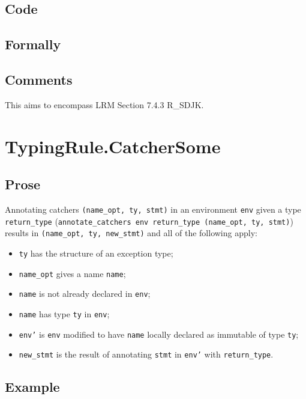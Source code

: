\documentclass{book}
\begin{document}
  \subsection{Code}

\begin{emptyformal}
    \subsection{Formally}
\end{emptyformal}

\subsection{Comments}
    This aims to encompass LRM Section 7.4.3 R\_SDJK.

\section{TypingRule.CatcherSome \label{sec:TypingRule.CatcherSome}}

  \subsection{Prose}
   Annotating catchers \texttt{(name\_opt, ty, stmt)} in an environment
\texttt{env} given a type \texttt{return\_type} (\texttt{annotate\_catchers env
return\_type (name\_opt, ty, stmt)}) results in \texttt{(name\_opt, ty,
new\_stmt)} and all of the following apply:
   \begin{itemize}
   \item \texttt{ty} has the structure of an exception type;
   \item \texttt{name\_opt} gives a name \texttt{name};
   \item \texttt{name} is not already declared in \texttt{env};
   \item \texttt{name} has type \texttt{ty} in \texttt{env};
   \item \texttt{env'} is \texttt{env} modified to have \texttt{name} locally declared as immutable of type \texttt{ty};
   \item \texttt{new\_stmt} is the result of annotating \texttt{stmt} in \texttt{env'} with \texttt{return\_type}.
   \end{itemize}

  \subsection{Example}
\end{document}
